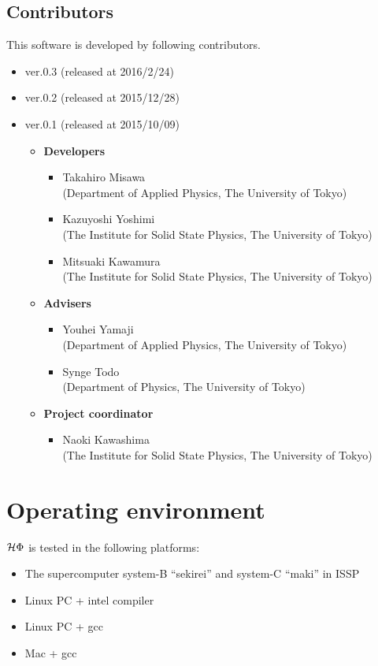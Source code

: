 \subsection{Contributors}
\label{subsec:contributors}
This software is developed by following contributors.
\begin{itemize}
\item{ver.0.3 (released at 2016/2/24)}
\item{ver.0.2 (released at 2015/12/28)}
\item{ver.0.1 (released at 2015/10/09)}
\begin{itemize}
	\item{\bf Developers}
	\begin{itemize}
	\item{Takahiro Misawa \\(Department of Applied Physics, The University of Tokyo)}
	\item{Kazuyoshi Yoshimi\\ (The Institute for Solid State Physics, The University of Tokyo)}
	\item{Mitsuaki Kawamura\\ (The Institute for Solid State Physics, The University of Tokyo)}
	\end{itemize}
	\item{\bf Advisers}
	\begin{itemize}
	\item{Youhei Yamaji\\ (Department of Applied Physics, The University of Tokyo)}
	\item{Synge Todo\\ (Department of Physics, The University of Tokyo)}
	\end{itemize}
	\item{\bf Project coordinator}
	\begin{itemize}
	\item{Naoki Kawashima\\ (The Institute for Solid State Physics, The University of Tokyo)}
	\end{itemize}
\end{itemize}
\end{itemize}

\section{Operating environment}
 $\mathcal{H} \Phi$ is tested in the following platforms:

\begin{itemize}
\item The supercomputer system-B ``sekirei'' and system-C ``maki'' in ISSP
\item Linux PC + intel compiler
\item Linux PC + gcc
\item Mac + gcc
\end{itemize}
